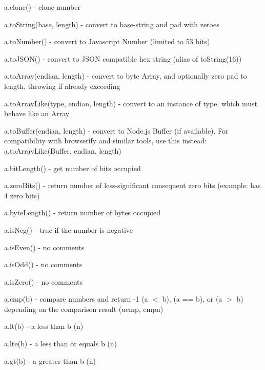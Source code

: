\begin{DoxyItemize}
\item {\ttfamily a.\+clone()} -\/ clone number
\item {\ttfamily a.\+to\+String(base, length)} -\/ convert to base-\/string and pad with zeroes
\item {\ttfamily a.\+to\+Number()} -\/ convert to Javascript Number (limited to 53 bits)
\item {\ttfamily a.\+to\+J\+S\+O\+N()} -\/ convert to J\+S\+ON compatible hex string (alias of {\ttfamily to\+String(16)})
\item {\ttfamily a.\+to\+Array(endian, length)} -\/ convert to byte {\ttfamily Array}, and optionally zero pad to length, throwing if already exceeding
\item {\ttfamily a.\+to\+Array\+Like(type, endian, length)} -\/ convert to an instance of {\ttfamily type}, which must behave like an {\ttfamily Array}
\item {\ttfamily a.\+to\+Buffer(endian, length)} -\/ convert to Node.\+js Buffer (if available). For compatibility with browserify and similar tools, use this instead\+: {\ttfamily a.\+to\+Array\+Like(\+Buffer, endian, length)}
\item {\ttfamily a.\+bit\+Length()} -\/ get number of bits occupied
\item {\ttfamily a.\+zero\+Bits()} -\/ return number of less-\/significant consequent zero bits (example\+: {} has 4 zero bits)
\item {\ttfamily a.\+byte\+Length()} -\/ return number of bytes occupied
\item {\ttfamily a.\+is\+Neg()} -\/ true if the number is negative
\item {\ttfamily a.\+is\+Even()} -\/ no comments
\item {\ttfamily a.\+is\+Odd()} -\/ no comments
\item {\ttfamily a.\+is\+Zero()} -\/ no comments
\item {\ttfamily a.\+cmp(b)} -\/ compare numbers and return {\ttfamily -\/1} (a {\ttfamily $<$} b), {} (a {\ttfamily ==} b), or {} (a {\ttfamily $>$} b) depending on the comparison result ({\ttfamily ucmp}, {\ttfamily cmpn})
\item {\ttfamily a.\+lt(b)} -\/ {\ttfamily a} less than {\ttfamily b} ({\ttfamily n})
\item {\ttfamily a.\+lte(b)} -\/ {\ttfamily a} less than or equals {\ttfamily b} ({\ttfamily n})
\item {\ttfamily a.\+gt(b)} -\/ {\ttfamily a} greater than {\ttfamily b} ({\ttfamily n})

\end{DoxyItemize}
